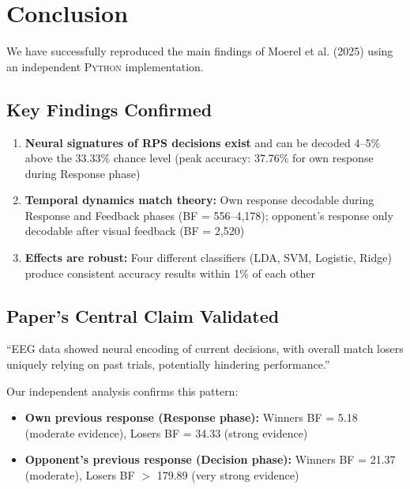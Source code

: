 \documentclass[11pt,a4paper]{article}
\newcommand{\python}{\textsc{Python}}
\begin{document}
\section{Conclusion}
\label{sec:conclusion}

We have successfully reproduced the main findings of Moerel et al. (2025) using an independent \python{} implementation.

\subsection{Key Findings Confirmed}
\label{subsec:key_findings}

\begin{enumerate}
    \item \textbf{Neural signatures of RPS decisions exist} and can be decoded 4--5\% above the 33.33\% chance level (peak accuracy: 37.76\% for own response during Response phase)
    \item \textbf{Temporal dynamics match theory:} Own response decodable during Response and Feedback phases (BF = 556--4,178); opponent's response only decodable after visual feedback (BF = 2,520)
    \item \textbf{Effects are robust:} Four different classifiers (LDA, SVM, Logistic, Ridge) produce consistent accuracy results within 1\% of each other
\end{enumerate}

\subsection{Paper's Central Claim Validated}
\label{subsec:central_claim}

\begin{paperquote}
``EEG data showed neural encoding of current decisions, with overall match losers uniquely relying on past trials, potentially hindering performance.''
\end{paperquote}

Our independent analysis confirms this pattern:
\begin{itemize}
    \item \textbf{Own previous response (Response phase):} Winners BF = 5.18 (moderate evidence), Losers BF = 34.33 (strong evidence)
    \item \textbf{Opponent's previous response (Decision phase):} Winners BF = 21.37 (moderate), Losers BF $>$ 179.89 (very strong evidence)
\end{itemize}
\end{document}
